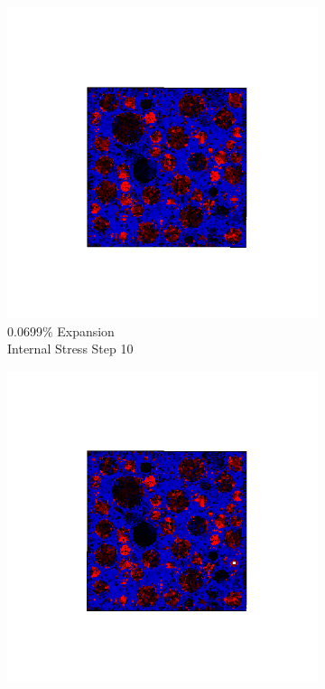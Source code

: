 \begin{figure}[h!]
\begin{subfigure}{.25\textwidth}
      \includegraphics[width=1.0\linewidth]{Files/exp_3D/ASR/A30P75_1_s10.png}
      \caption{0.0699\% Expansion\\Internal Stress Step 10}
    \end{subfigure}%
    \begin{subfigure}{.25\textwidth}
      \centering
      \includegraphics[width=1.0\linewidth]{Files/exp_3D/ASR/A30P75_1_s15.png}

\end{subfigure}
\end{figure}
